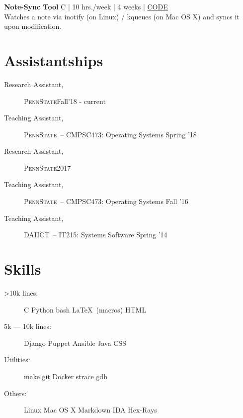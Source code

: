 \documentclass[margin]{res}
\newcommand{\daiict}{\textsc{DAIICT}}
\newcommand{\psu}{\textsc{PennState}}
\begin{document}
\begin{resume}
{\bfseries Note-Sync Tool}\hfill
{\small C | 10 hrs./week | 4 weeks | \href{https://github.com/mitthu/note-sync}{CODE}}\\
Watches a note via inotify (on Linux) / kqueues (on Mac OS X) and syncs it upon modification.

\section{Assistantships} 
\begin{description}
    \item[Research Assistant,] \psu \hfill Fall'18 - current
    \item[Teaching Assistant,] \psu\ -- CMPSC473: Operating Systems \hfill Spring '18 %
    \item[Research Assistant,] \psu \hfill 2017
    \item[Teaching Assistant,] \psu\ -- CMPSC473: Operating Systems \hfill Fall '16 %
    \item[Teaching Assistant,] \daiict\ -- IT215: Systems Software \hfill Spring '14 %
\end{description}

\section{Skills}
\begin{description}
    \item[>10k lines:]
        C \textbullet{}
        Python \textbullet{}
        bash \textbullet{}
        \LaTeX\ (macros) \textbullet{}
        HTML

    \item[5k --- 10k lines:]
        Django \textbullet{}
        Puppet \textbullet{}
        Ansible \textbullet{}
        Java \textbullet{}
        CSS

    \item[Utilities:]
        make \textbullet{}
        git \textbullet{}
        Docker \textbullet{}
        strace \textbullet{}
        gdb

    \item[Others:]
        Linux \textbullet{}
        Mac OS X \textbullet{}
        Markdown \textbullet{}
        IDA Hex-Rays
\end{description}


\end{resume}
\end{document}
